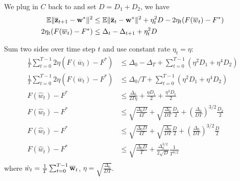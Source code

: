 We plug in $C$ back to \eq{\ref{eq:nagcvx7}} and set $D=D_1 + D_2$, we have 
\begin{align}
\mathbb{E}\|\overline{{\mathbf{z}}}_{t+1} - {\mathbf{w}}^* \|^2 & \leq \mathbb{E} \| \overline{{\mathbf{z}}}_{t} - {\mathbf{w}}^*\|^2  +  \eta_t^2 D   - 2\eta_t(F(\overline{w}_t) - F^*) \nonumber\\	
 2\eta_t(F(\overline{w}_t) - F^*) & \leq  \Delta_{t}  - \Delta_{t+1}  +  \eta_t^2 D    \nonumber
\end{align}

Sum two sides over time step $t$ and use constant rate $\eta_t = \eta$:
\begin{align}
\frac{1}{T}\sum_{t=0}^{T-1} 2 \eta (F(\overline{w}_t) - F^*) & \leq \Delta_0 - \Delta_{T} + \sum_{t=0}^{T-1} (\eta^2 D_1 + \eta^4 D_2) \nonumber\\
\frac{1}{T}\sum_{t=0}^{T-1} 2 \eta (F(\overline{w}_t) - F^*) & \leq \Delta_0/T  + \sum_{t=0}^{T-1} (\eta^2 D_1 + \eta^4 D_2)\nonumber\\
 F(\hat{w}_t) - F^* & \leq \frac{\Delta_0}{2T\eta}   + \frac{\eta D_1}{2} + \frac{\eta^3 D_1}{2}\nonumber\\
 F(\hat{w}_t) - F^* & \leq \sqrt{\frac{\Delta_0D}{4T}} + \sqrt{\frac{\Delta_0}{DT}}\frac{ D_1}{2} + (\frac{\Delta_0}{DT})^{3/2}\frac{ D_2}{2} \nonumber\\
 F(\hat{w}_t) - F^* & \leq \sqrt{\frac{\Delta_0D}{4T}} + \sqrt{\frac{\Delta_0}{DT}}\frac{ D}{2} + (\frac{\Delta_0}{DT})^{3/2}\frac{ D}{2} \nonumber\\
 F(\hat{w}_t) - F^* & \leq \sqrt{\frac{\Delta_0D}{T}} + \frac{\Delta_0^{3/2}}{2\sqrt{D}}\frac{1}{T^{3/2}} \nonumber\\
\end{align}
where $\hat{w}_t = \frac{1}{T}\sum_{t=0}^{T-1} {\overline{\mathbf{w}}}_t$, $\eta = \sqrt{\frac{\Delta_0}{DT}}$.













